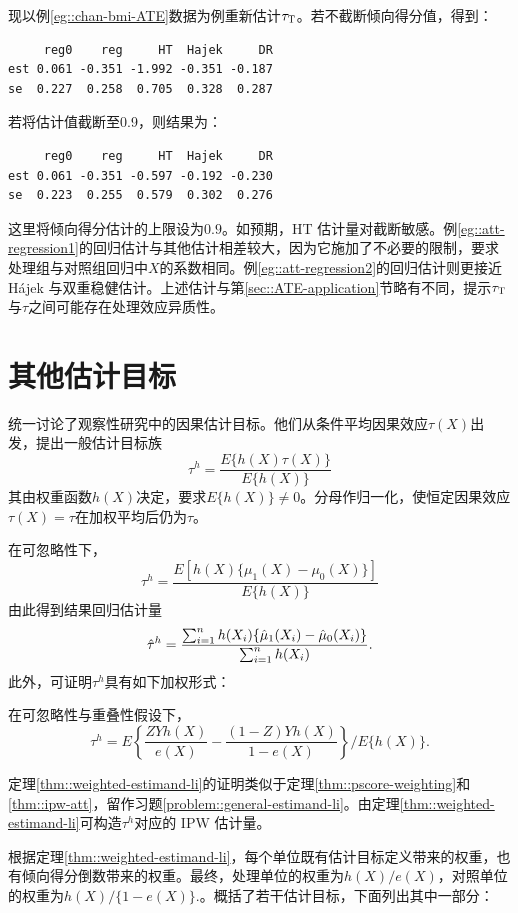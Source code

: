  
现以例\ref{eg::chan-bmi-ATE}数据为例重新估计$\tau_\textsc{T}$。若不截断倾向得分值，得到：
\begin{lstlisting}
     reg0    reg     HT  Hajek     DR
est 0.061 -0.351 -1.992 -0.351 -0.187
se  0.227  0.258  0.705  0.328  0.287
\end{lstlisting}
若将估计值截断至0.9，则结果为：
\begin{lstlisting}
     reg0    reg     HT  Hajek     DR
est 0.061 -0.351 -0.597 -0.192 -0.230
se  0.223  0.255  0.579  0.302  0.276
\end{lstlisting}
这里将倾向得分估计的上限设为$0.9$。如预期，HT 估计量对截断敏感。例\ref{eg::att-regression1}的回归估计与其他估计相差较大，因为它施加了不必要的限制，要求处理组与对照组回归中$X$的系数相同。例\ref{eg::att-regression2}的回归估计则更接近 Hájek 与双重稳健估计。上述估计与第\ref{sec::ATE-application}节略有不同，提示$\tau_\textsc{T}$与$\tau$之间可能存在处理效应异质性。



\section{其他估计目标}\label{sec::other-estmand-overlap}


\citet{li2018balancing}统一讨论了观察性研究中的因果估计目标。他们从条件平均因果效应$\tau(X)$出发，提出一般估计目标族
$$
\tau^h =  \frac{  E\{ h(X) \tau(X)  \} }{ E\{ h(X)   \} }
$$
其由权重函数$h(X)$决定，要求$E\{ h(X)   \}  \neq 0$。分母作归一化，使恒定因果效应$\tau(X) = \tau$在加权平均后仍为$\tau$。 


在可忽略性下，
$$
\tau^h =  \frac{  E[  h(X)   \{ \mu_1(X) - \mu_0(X) \}   ] }{ E\{ h(X)   \} }
$$
由此得到结果回归估计量
$$
\hat \tau^h =  \frac{   \sum_{i=1}^n h(X_i)  \{ \hat{\mu}_1(X_i)   -  \hat{\mu}_0(X_i) \}  }{  \sum_{i=1}^n h(X_i) } .
$$
此外，可证明$\tau^h$具有如下加权形式：

\begin{theorem}\label{thm::weighted-estimand-li}
在可忽略性与重叠性假设下，
$$
\tau^h = E\left\{ \frac{ZYh(X)}{ e(X)}  - \frac{(1-Z)Yh(X)}{1-e(X)}  \right\} / E\{ h(X)   \} .
$$
\end{theorem}

定理\ref{thm::weighted-estimand-li}的证明类似于定理\ref{thm::pscore-weighting}和\ref{thm::ipw-att}，留作习题\ref{problem::general-estimand-li}。由定理\ref{thm::weighted-estimand-li}可构造$\tau^h$对应的 IPW 估计量。 


根据定理\ref{thm::weighted-estimand-li}，每个单位既有估计目标定义带来的权重，也有倾向得分倒数带来的权重。最终，处理单位的权重为$h(X) / e(X)$，对照单位的权重为$h(X)/ \{  1-e(X) \}.$。\citet[][Table 1]{li2018balancing}概括了若干估计目标，下面列出其中一部分： 

